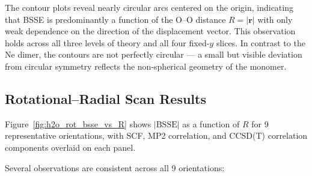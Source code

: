 The contour plots reveal nearly circular arcs centered on the origin,
indicating that BSSE is predominantly a function of the O--O distance
$R = |\mathbf{r}|$ with only weak dependence on the direction of the
displacement vector. This observation holds across all three levels of
theory and all four fixed-$y$ slices. In contrast to the Ne dimer,
the contours are not perfectly circular --- a small but visible
deviation from circular symmetry reflects the non-spherical geometry
of the  monomer.

\subsection{Rotational--Radial Scan Results}

Figure~\ref{fig:h2o_rot_bsse_vs_R} shows $|\text{BSSE}|$ as a
function of $R$ for 9 representative orientations, with SCF, MP2
correlation, and CCSD(T) correlation components overlaid on each
panel.

Several observations are consistent across all 9 orientations:

